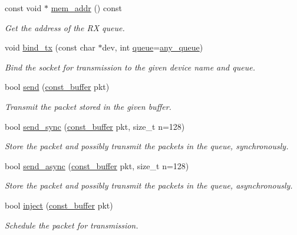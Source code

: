 \begin{DoxyCompactItemize}
const void $\ast$ \hyperlink{classnet_1_1pfq_a1f16289a4ddffd497ef2dd9c7523bccb}{mem\-\_\-addr} () const 
\begin{DoxyCompactList}\small\item\em Get the address of the R\-X queue. \end{DoxyCompactList}\item 
void \hyperlink{classnet_1_1pfq_a00ba716bc74388ec7facc7c59d92fa6d}{bind\-\_\-tx} (const char $\ast$dev, int \hyperlink{classnet_1_1queue}{queue}=\hyperlink{classnet_1_1pfq_a0d4eca6d0925b7c49365675c9cf9385c}{any\-\_\-queue})
\begin{DoxyCompactList}\small\item\em Bind the socket for transmission to the given device name and queue. \end{DoxyCompactList}\item 
bool \hyperlink{classnet_1_1pfq_a9bd5ed424666bbfc6c54de476b3ee274}{send} (\hyperlink{namespacenet_a05639001760fe5164b163078b5ccc2c0}{const\-\_\-buffer} pkt)
\begin{DoxyCompactList}\small\item\em Transmit the packet stored in the given buffer. \end{DoxyCompactList}\item 
bool \hyperlink{classnet_1_1pfq_adfa55afc44e561314349bf5995c06bae}{send\-\_\-sync} (\hyperlink{namespacenet_a05639001760fe5164b163078b5ccc2c0}{const\-\_\-buffer} pkt, size\-\_\-t n=128)
\begin{DoxyCompactList}\small\item\em Store the packet and possibly transmit the packets in the queue, synchronously. \end{DoxyCompactList}\item 
bool \hyperlink{classnet_1_1pfq_a133184c3a7eee9b8110941436de0a05d}{send\-\_\-async} (\hyperlink{namespacenet_a05639001760fe5164b163078b5ccc2c0}{const\-\_\-buffer} pkt, size\-\_\-t n=128)
\begin{DoxyCompactList}\small\item\em Store the packet and possibly transmit the packets in the queue, asynchronously. \end{DoxyCompactList}\item 
bool \hyperlink{classnet_1_1pfq_ac3ff560f61fb181bbc94f305c8f98569}{inject} (\hyperlink{namespacenet_a05639001760fe5164b163078b5ccc2c0}{const\-\_\-buffer} pkt)
\begin{DoxyCompactList}\small\item\em Schedule the packet for transmission. \end{DoxyCompactList}\item 

\end{DoxyCompactItemize}
